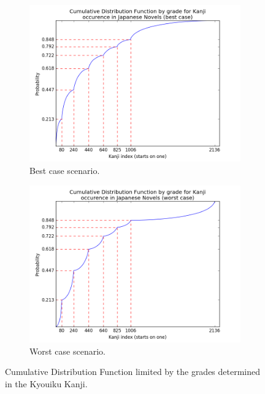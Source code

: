 \begin{figure}[ht]
    \centering
    \begin{subfigure}{0.9\textwidth}
    \centering
    \includegraphics[width=\linewidth]{Cap2/CDFGrade}
    \caption{Best case scenario.}
    \label{fig:cdfgradebest}
    \end{subfigure}
    \begin{subfigure}{0.9\textwidth}
    \centering
    \includegraphics[width=\linewidth]{Cap2/CDFGradeWorst}
    \caption{Worst case scenario.}
    \label{fig:cdfgradebestworst}
    \end{subfigure}
    
    \caption{Cumulative Distribution Function limited by the grades determined in the Kyouiku Kanji.}
    \label{fig:cdfgrade}
\end{figure}

